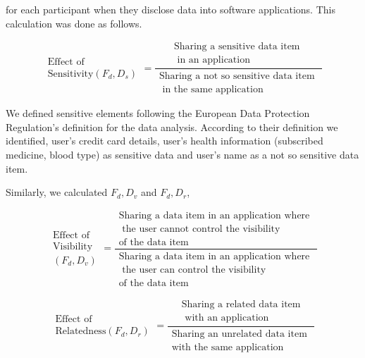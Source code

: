 \documentclass[conference]{IEEEtran}
\begin{document}
for each participant when they disclose data into software applications. This calculation was done as follows.

\[ \begin{aligned} \text{Effect of } \\ \text{Sensitivity}(F_{d}, D_{s}) \end{aligned} =
\frac{\begin{aligned}
      \text{Sharing a sensitive data item } \\ \text{ in an application}
      \end{aligned}}%
 {\begin{aligned}
      \text{Sharing a not so sensitive data item }\\ \text{ in the same application}
      \end{aligned}}
\]

We defined sensitive elements following the European Data Protection Regulation's definition for the data analysis. According to their definition we identified, user's credit card details, user's health information (subscribed medicine, blood type) as sensitive data and user's name as a not so sensitive data item. 

Similarly, we calculated $F_d,D_v$ and $F_d,D_r$,

\[ \begin{aligned} \text{Effect of } \\ \text{Visibility}\\ (F_{d},D_{v}) \end{aligned} =
\frac{\begin{aligned}
      \text{Sharing a data item in an application where } \\ \text{ the user cannot control the visibility} \\ \text{of the data item}
      \end{aligned}}%
 {\begin{aligned}
       \text{Sharing a data item in an application where } \\ \text{ the user can control the visibility} \\ \text{of the data item}
      \end{aligned}}
\]



\[ \begin{aligned} \text{Effect of } \\ \text{Relatedness}(F_{d},D_{r})\end{aligned} =
\frac{\begin{aligned}
      \text{Sharing a related data item} \\ \text{  with an application}
      \end{aligned}}%
 {\begin{aligned}
      \text{Sharing an unrelated data item }\\ \text{with the same application}
      \end{aligned}}
\]
\end{document}

